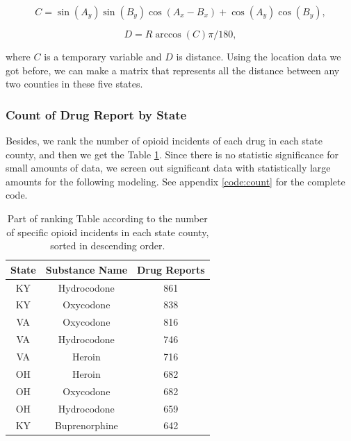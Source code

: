 \documentclass{mcmthesis}
\begin{document}
\begin{equation}
\label{1}
          C = \sin(A_y)\sin(B_y)\cos(A_x-B_x) + \cos(A_y)\cos(B_y),
\end{equation}

\begin{equation}
\label{2}
         D = R\arccos(C)\pi/180,
\end{equation}

    
    where $C$ is a temporary variable and $D$ is distance. Using the location data we got before, we can make a matrix that represents all the distance between any two counties in these five states.

\subsubsection{Count of Drug Report by State}\label{count-drug}

    Besides, we rank the number of opioid incidents of each drug in each state county, and then we get the Table \ref{tab:my_label}. Since there is no statistic significance for small amounts of data, we screen out significant data with statistically large amounts for the following modeling. See appendix \ref{code:count} for the complete code. 
    
\begin{table}[H]
    \centering  
    \caption{Part of ranking Table according to the number of specific opioid incidents in each state county, sorted in descending order.}
    \label{tab:my_label}
    \begin{tabular}{|c|c|c|}
        \hline
        State & Substance Name & Drug Reports \\\hline
        KY & Hydrocodone & 861 \\
        KY & Oxycodone & 838 \\
        VA & Oxycodone & 816 \\
        VA & Hydrocodone & 746 \\
        VA & Heroin & 716 \\
        OH & Heroin & 682 \\
        OH & Oxycodone & 682 \\
        OH & Hydrocodone & 659 \\
        KY & Buprenorphine & 642 \\\hline
    \end{tabular}
\end{table}    
    
    
\end{document}

